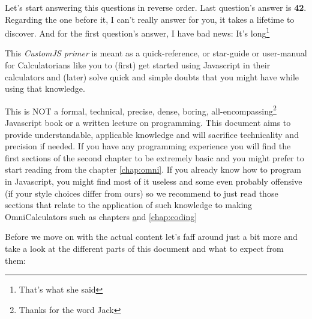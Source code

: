 \documentclass[11pt,a4paper,oldfontcommands]{memoir}
\begin{document}
    Let's start answering this questions in reverse order. Last question's answer is \textbf{42}. Regarding the one before it, I can't really answer for you, it takes a lifetime to discover. And for the first question's answer, I have bad news: It's long\footnote{That's what she said}

    This \textit{CustomJS primer} is meant as a quick-reference, or star-guide or user-manual for Calculatorians like you to (first) get started using Javascript in their calculators and (later) solve quick and simple doubts that you might have while using that knowledge.

This is NOT a formal, technical, precise, dense, boring, all-encompassing\footnote{Thanks for the word Jack} Javascript book or a written lecture on programming. This document aims to provide understandable, applicable knowledge and will sacrifice technicality and precision if needed. 
If you have any programming experience you will find the first sections of the second chapter to be extremely basic and you might prefer to start reading from the chapter \ref{chap:omni}. If you already know how to program in Javascript, you might find most of it useless and some even probably offensive (if your style choices differ from ours) so we recommend to just read those sections that relate to the application of such knowledge to making OmniCalculators such as chapters \href{chap:omni} and \ref{chap:coding}

Before we move on with the actual content let's faff around just a bit more and take a look at the different parts of this document and what to expect from them:

\iffalse
\begin{itemize}
    \item Chapter 1.- \textbf{Before you start} 
        \subitem Section 1.1 - A brief description of that is CustomJS what it does and how and when to use it
        \subitem Section 1.2 - Quick overview of the functions specific to omni that don't exist in regular JS
        \subitem Section 1.3 - A \textit{Gepe-complete}\footnote{\textit{Gepe-complete} Refers to an item that's been deemed complete by Alvaro Diez} start guide to get you started in programming from scratch, plus some additions relevant to CustomJS at Omni
        \subitem Section 1.4 - A collection of \textit{rules} that we have in place at Omni and their reasons to exist
    \item Chapter 2.- \textbf{Okay so you are already coding...}
        \subitem Section 2.1 - Basic and advance use cases in Custom JS with strong focus on Omni functions
        \subitem Section 2.2 - How to prevent errors and what to do when they happen
        \subitem Section 2.3 - Style guide as agreed by most of Omni Calculatorians. Follow or be bullied.
\end{itemize}
\fi
\end{document}
